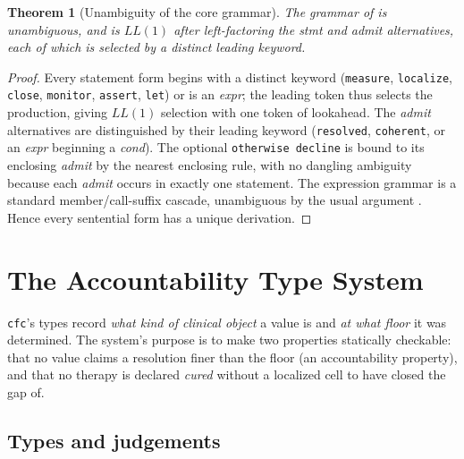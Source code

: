 \documentclass[11pt,a4paper]{article}
\theoremstyle{cfcthm}
\newtheorem{theorem}{Theorem}[section]
\theoremstyle{definition}
\theoremstyle{remark}
\newcommand{\cf}[1]{\texttt{#1}}
\begin{document}
\begin{theorem}[Unambiguity of the core grammar]
\label{thm:unambiguous}
The grammar of  is unambiguous, and is $LL(1)$ after
left-factoring the \textit{stmt} and \textit{admit} alternatives, each of which
is selected by a distinct leading keyword.
\end{theorem}

\begin{proof}
Every statement form begins with a distinct keyword (\cf{measure},
\cf{localize}, \cf{close}, \cf{monitor}, \cf{assert}, \cf{let}) or is an
\textit{expr}; the leading token thus selects the production, giving $LL(1)$
selection with one token of lookahead. The \textit{admit} alternatives are
distinguished by their leading keyword (\cf{resolved}, \cf{coherent}, or an
\textit{expr} beginning a \textit{cond}). The optional
\cf{otherwise decline} is bound to its enclosing \textit{admit} by the nearest
enclosing rule, with no dangling ambiguity because each \textit{admit} occurs
in exactly one statement. The expression grammar is a standard
member/call-suffix cascade, unambiguous by the usual argument
\citep{aho2006compilers}. Hence every sentential form has a unique derivation.
\end{proof}

\section{The Accountability Type System}
\label{sec:types}

\cf{cfc}'s types record \emph{what kind of clinical object} a value is and
\emph{at what floor} it was determined. The system's purpose is to make two
properties statically checkable: that no value claims a resolution finer than
the floor (an accountability property), and that no therapy is declared
\emph{cured} without a localized cell to have closed the gap of.

\subsection{Types and judgements}
\end{document}
